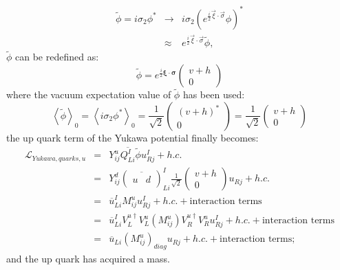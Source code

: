 \begin{eqnarray}
\tilde{\phi} = i\sigma_2\phi^* &\rightarrow& i\sigma_2\left(e^{\frac{i}{2}\vec{\xi} \cdot \vec{\sigma}} \phi \right)^* \nonumber \\
&\approx& e^{\frac{i}{2}\vec{\xi} \cdot \vec{\sigma}} \tilde{\phi},
\label{eqn:trmfphitilde}
\end{eqnarray}
 $\tilde{\phi}$ can be redefined as:
\begin{equation}
\tilde{\phi} = e^{\frac{i}{2}\mathbf{\xi \cdot \sigma}}\left( \begin{array}{c} v+h \\ 0 \end{array} \right)
\label{eqn:phitildedefined}
\end{equation}
where the vacuum expectation value of $\tilde{\phi}$ has been used:
\begin{equation}
\left<\tilde{\phi}\right>_0 = \left<i\sigma_2\phi^*\right>_0 = \frac{1}{\sqrt{2}} \left( \begin{array}{c} (v + h)^* \\ 0 \end{array} \right) = \frac{1}{\sqrt{2}} \left( \begin{array}{c} v + h \\ 0 \end{array} \right)
\label{eqn:vevphitilde}
\end{equation}
the up quark term of the Yukawa potential finally becomes:
\begin{eqnarray}
\mathcal L_{Yukawa,quarks,u} &=&  Y^u_{ij}\overline{Q^I_{Li}}\tilde{\phi} u^I_{Rj} + h.c. \nonumber \\
&=& Y^d_{ij}  \left( \overline{ \begin{array}{cc} u & d \end{array} } \right)^I_{Li}  \frac{1}{\sqrt{2}}  \left( \begin{array}{c} v + h \\ 0 \end{array} \right)  u_{Rj} + h.c.\nonumber \\ 
&=& \overline{u}^I_{Li}M^u_{ij}u^I_{Rj} + h.c. + \mbox{interaction terms} \nonumber \\
&=& \overline{u}^I_{Li}V^{u\dag}_LV^u_L(M^u_{ij})V^{u\dag}_R V^u_Ru^I_{Rj} + h.c. + \mbox{interaction terms} \nonumber\\
&=& \overline{u}_{Li}(M^u_{ij})_{diag}u_{Rj} + h.c. + \mbox{interaction terms};
\label{eqn:SMLYukawaUquark}
\end{eqnarray}
and the up quark has acquired a mass.

